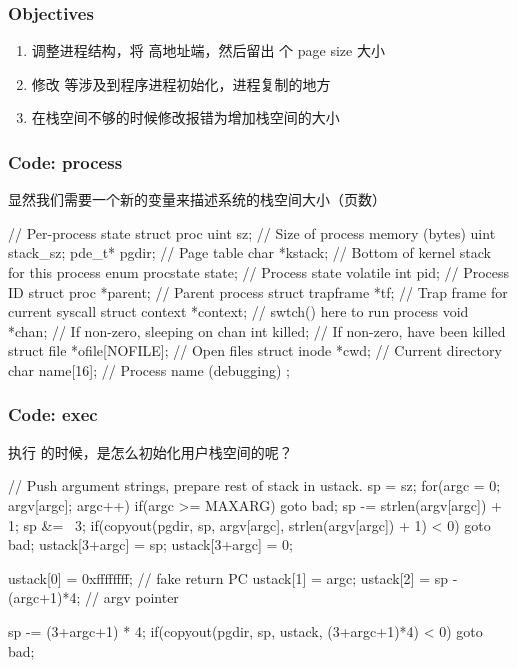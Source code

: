 \subsubsection{Objectives}

\begin{enumerate}
    \item 调整进程结构，将 高地址端，然后留出  个 page size 大小
    \item 修改  等涉及到程序进程初始化，进程复制的地方
    \item 在栈空间不够的时候修改报错为增加栈空间的大小
\end{enumerate}


\subsubsection{Code: process}

显然我们需要一个新的变量来描述系统的栈空间大小（页数）


\begin{ccode}
    // Per-process state
    struct proc {
        uint sz;                     // Size of process memory (bytes)
        uint stack_sz;
        pde_t* pgdir;                // Page table
        char *kstack;                // Bottom of kernel stack for this process
        enum procstate state;        // Process state
        volatile int pid;            // Process ID
        struct proc *parent;         // Parent process
        struct trapframe *tf;        // Trap frame for current syscall
        struct context *context;     // swtch() here to run process
        void *chan;                  // If non-zero, sleeping on chan
        int killed;                  // If non-zero, have been killed
        struct file *ofile[NOFILE];  // Open files
        struct inode *cwd;           // Current directory
        char name[16];               // Process name (debugging)
    };
\end{ccode}

\subsubsection{Code: exec}

执行  的时候，是怎么初始化用户栈空间的呢？

\begin{ccode}
    // Push argument strings, prepare rest of stack in ustack.
    sp = sz;
    for(argc = 0; argv[argc]; argc++) {
        if(argc >= MAXARG)
        goto bad;
        sp -= strlen(argv[argc]) + 1;
        sp &= ~3;
        if(copyout(pgdir, sp, argv[argc], strlen(argv[argc]) + 1) < 0)
        goto bad;
        ustack[3+argc] = sp;
    }
    ustack[3+argc] = 0;

    ustack[0] = 0xffffffff;  // fake return PC
    ustack[1] = argc;
    ustack[2] = sp - (argc+1)*4;  // argv pointer

    sp -= (3+argc+1) * 4;
    if(copyout(pgdir, sp, ustack, (3+argc+1)*4) < 0)
        goto bad;
\end{ccode}

